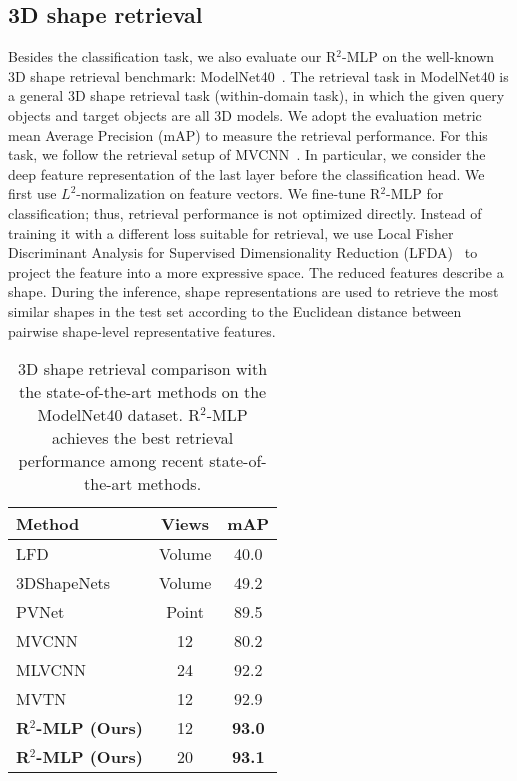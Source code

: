 \documentclass[11pt]{article}
\begin{document}
\subsection{3D shape retrieval}
Besides the classification task, we also evaluate our R$^2$-MLP on the well-known 3D shape retrieval benchmark: ModelNet40~\citep{chang2015shapenet}. The retrieval task in ModelNet40 is a general 3D shape retrieval task (within-domain task), in which the given query objects and target objects are all 3D models. We adopt the evaluation metric mean Average Precision (mAP) to measure the retrieval performance.
For this task, we follow the retrieval setup of MVCNN~\citep{su2015multi}. In particular, we consider the deep feature representation of the last layer before the classification head. We first use $L^2$-normalization on feature vectors.
We fine-tune R$^2$-MLP for classification; thus, retrieval performance is not optimized directly.
Instead of training it with a different loss suitable for retrieval, we use Local Fisher Discriminant Analysis for Supervised Dimensionality Reduction (LFDA)~\citep{sugiyama2007dimensionality} to project the feature into a more expressive space.
The reduced features describe a shape. During the inference, shape representations are used to retrieve the most similar shapes in the test set according to the Euclidean distance between pairwise shape-level representative features. \\

\begin{table}[htb!]
\caption{3D shape retrieval comparison with the state-of-the-art methods on the ModelNet40 dataset. R$^2$-MLP achieves the best retrieval performance among recent state-of-the-art methods.}\label{tab:retrieval}
\centering
\begin{tabular}{lcc}
\toprule
Method & Views & mAP \\
\midrule
LFD~\citep{chen2003visual} & Volume & 40.0 \\
3DShapeNets~\citep{chang2015shapenet} & Volume & 49.2 \\
PVNet~\citep{you2018pvnet} & Point & 89.5 \\
MVCNN~\citep{su2015multi} & 12 & 80.2 \\
MLVCNN~\citep{jiang2019mlvcnn} & 24 & 92.2 \\
MVTN~\citep{hamdi2021mvtn} & 12 & 92.9 \\
\rowcolor{mygray} {\textbf{R$^2$-MLP (Ours)}} & 12 & \textbf{93.0} \\
\rowcolor{mygray} {\textbf{R$^2$-MLP (Ours)}} & 20 & \textbf{93.1} \\
\bottomrule
\end{tabular}\vspace{0.2in}
\end{table}
\end{document}
